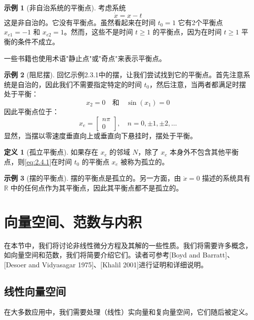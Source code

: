 \documentclass[UTF8,12pt,a4paper]{ctexart}
\theoremstyle{definition}
\newtheorem{definition}{定义}[section]
\newtheorem{example}{示例}[section]
\begin{document}
\begin{example}[非自治系统的平衡点]
考虑系统
\[
\dot{x} = x - t
\]
这是非自治的。它没有平衡点。虽然看起来在时间 $t_0=1$ 它有2个平衡点 $x_{e1}=-1$ 和 $x_{e2}=1$。然而，这些不是时间 $t \geq 1$ 的平衡点，因为在时间 $t \geq 1$ 平衡的条件不成立。
\end{example}

一些书籍也使用术语"静止点"或"奇点"来表示平衡点。

\begin{example}[阻尼摆]
回忆示例2.3.1中的摆，让我们尝试找到它的平衡点。首先注意系统是自治的，因此我们不需要指定特定的时间 $t_0$，然后注意，当两者都满足时摆处于平衡：
\[
x_2 = 0 \quad \text{和} \quad \sin(x_1) = 0
\]
因此平衡点位于：
\[
x_e = \begin{bmatrix} n\pi \\ 0 \end{bmatrix}, \quad n = 0, \pm 1, \pm 2, \ldots
\]
显然，当摆以零速度垂直向上或垂直向下悬挂时，摆处于平衡。
\end{example}

\begin{definition}[孤立平衡点]
如果存在 $x_e$ 的邻域 $N$，除了 $x_e$ 本身外不包含其他平衡点，则\eqref{eq:2.4.1}在时间 $t_0$ 的平衡点 $x_e$ 被称为孤立的。
\end{definition}

\begin{example}[摆的平衡点]
摆的平衡点是孤立的。另一方面，由 $\dot{x}=0$ 描述的系统具有 $\mathbb{R}$ 中的任何点作为其平衡点，因此其平衡点都不是孤立的。
\end{example}

\section{向量空间、范数与内积}

在本节中，我们将讨论非线性微分方程及其解的一些性质。我们将需要许多概念，如向量空间和范数，我们将简要介绍它们。读者可参考[Boyd and Barratt]、[Desoer and Vidyasagar 1975]、[Khalil 2001]进行证明和详细说明。

\subsection{线性向量空间}

在大多数应用中，我们需要处理（线性）实向量和复向量空间，它们随后被定义。
\end{document}
